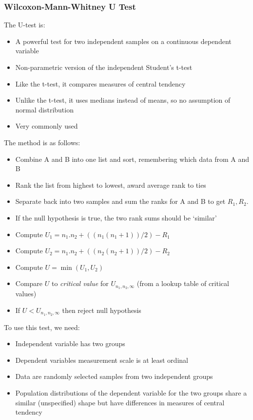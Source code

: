 \documentclass[11pt,a4paper,titlepage,dvipsnames,cmyk]{scrartcl}
\begin{document}
\subsubsection{Wilcoxon-Mann-Whitney U Test}
The U-test is:
\begin{itemize}
    \item A powerful test for two independent samples on a continuous dependent variable
    \item Non-parametric version of the independent Student's t-test
    \item Like the t-test, it compares measures of central tendency
    \item Unlike the t-test, it uses medians instead of means, so no assumption of normal distribution
    \item Very commonly used
\end{itemize}

The method is as follows:
\begin{itemize}
    \item Combine A and B into one list and sort, remembering which data from A and B
    \item Rank the list from highest to lowest, award average rank to ties
    \item Separate back into two samples and sum the ranks for A and B to get $R_1, R_2$.
    \item If the null hypothesis is true, the two rank sums should be `similar'
    \item Compute $U_1 = n_1 . n_2 + ((n_1(n_1+1))/2) - R_1$
    \item Compute $U_2 = n_1 . n_2 + ((n_2(n_2+1))/2) - R_2$
    \item Compute $U = \min(U_1, U_2)$
    \item Compare $U$ to \textit{critical value} for $U_{n_1, n_2, \infty}$ (from a lookup table of critical values)
    \item If $U<U_{n_1,n_2,\infty}$ then reject null hypothesis
\end{itemize}

To use this test, we need:
\begin{itemize}
    \item Independent variable has two groups
    \item Dependent variables measurement scale is at least ordinal
    \item Data are randomly selected samples from two independent groups
    \item Population distributions of the dependent variable for the two groups share a similar (unspecified) shape but have differences in measures of central tendency
\end{itemize}
\end{document}
